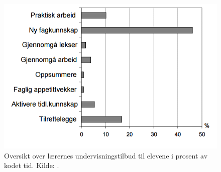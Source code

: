 \documentclass[main.tex]{subfiles}
\begin{document}
\begin{figure}[h!]
\includegraphics[scale = 0.6]{../figures/undervisnings_aktivitet.png}
\caption{Oversikt over lærernes undervisningstilbud til elevene i prosent av kodet tid. Kilde: \protect{}.}
\label{fig:odeg10}
\end{figure}






\end{document}
